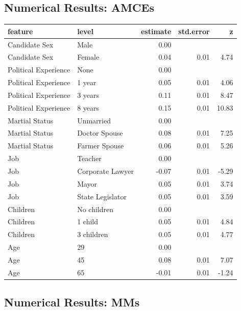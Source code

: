\documentclass[a4paper,12pt]{article}\usepackage[]{graphicx}\usepackage[]{color}
\begin{document}
\clearpage

\subsection{Numerical Results: AMCEs}

\begin{table}[ht]
\centering
\begin{tabular}{lp{1.5in}rrr}
  \hline
feature & level & estimate & std.error & z \\ 
  \hline
Candidate Sex & Male & 0.00 &  &  \\ 
  Candidate Sex & Female & 0.04 & 0.01 & 4.74 \\ 
  Political Experience & None & 0.00 &  &  \\ 
  Political Experience & 1 year & 0.05 & 0.01 & 4.06 \\ 
  Political Experience & 3 years & 0.11 & 0.01 & 8.47 \\ 
  Political Experience & 8 years & 0.15 & 0.01 & 10.83 \\ 
  Martial Status & Unmarried & 0.00 &  &  \\ 
  Martial Status & Doctor Spouse & 0.08 & 0.01 & 7.25 \\ 
  Martial Status & Farmer Spouse & 0.06 & 0.01 & 5.26 \\ 
  Job & Teacher & 0.00 &  &  \\ 
  Job & Corporate Lawyer & -0.07 & 0.01 & -5.29 \\ 
  Job & Mayor & 0.05 & 0.01 & 3.74 \\ 
  Job & State Legislator & 0.05 & 0.01 & 3.59 \\ 
  Children & No children & 0.00 &  &  \\ 
  Children & 1 child & 0.05 & 0.01 & 4.84 \\ 
  Children & 3 children & 0.05 & 0.01 & 4.77 \\ 
  Age & 29 & 0.00 &  &  \\ 
  Age & 45 & 0.08 & 0.01 & 7.07 \\ 
  Age & 65 & -0.01 & 0.01 & -1.24 \\ 
   \hline
\end{tabular}
\end{table}


\clearpage

\subsection{Numerical Results: MMs}
\end{document}
